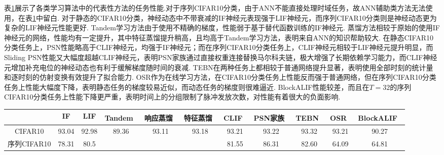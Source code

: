 \documentclass[10.5pt,compsoc,UTF8]{CjC}
\theoremstyle{mystyle}
\newcommand{\upcite}[1]{\textsuperscript{\cite{#1}}}
\begin{document}
\begin{multicols}{1}
表\ref{tab: cmp acc}展示了各类学习算法中的代表性方法的任务性能.对于序列CIFAR10分类，由于ANN不能直接处理时域任务，故ANN辅助类方法无法使用，在表\ref{tab: cmp acc}中留白.
对于静态的CIFAR10分类，神经动态中不带衰减的IF神经元表现强于LIF神经元，而序列CIFAR10分类则是神经动态更为复杂的LIF神经元性能更好.
Tandem学习方法由于使用不精确的梯度，性能弱于基于替代函数训练的IF神经元.
蒸馏方法相较于原始的使用IF神经元的网络，性能均有一定提升，其中特征蒸馏提升稍高，且均高于Tandem学习方法，表明来自ANN的知识帮助较大.
在静态CIFAR10分类任务上，PSN性能略高于CLIF神经元，均强于IF神经元；而在序列CIFAR10分类任务上，CLIF神经元相较于LIF神经元提升明显，而Sliding PSN性能又大幅度超越CLIF神经元，表明PSN家族通过直接权重连接替换马尔科夫链，极大增强了长期依赖学习能力，而CLIF神经元增加补充电位的神经动态也有利于缓解梯度随时间的衰减.
TEBN在两种任务上都相较于普通网络提升显著，表明使用全部时刻的统计量和逐时刻的仿射变换有效提升了拟合能力.
OSR作为在线学习方法，在CIFAR10分类任务上性能反而强于普通网络，但在序列CIFAR10分类任务上性能大幅度下降，表明静态任务的梯度较易近似，而动态任务的梯度则很难逼近.
BlockALIF性能较差，而且在$T=32$的序列CIFAR10分类任务上性能下降更严重，表明时间上的分组限制了脉冲发放次数，对性能有着很大的负面影响.
\begin{table}[H]
	\vspace {-2.5mm}
	\begin{center}
		\begin{tabular}{ccccccccccc}
			\toprule
			& IF    & LIF   & Tandem~\upcite{wu2021tandem} & 响应蒸馏~\upcite{xu2023constructing}  & 特征蒸馏~\upcite{xu2023constructing}  & CLIF~\upcite{huang2024clif}  & PSN家族~\upcite{fang2023parallel} & TEBN~\upcite{duan2022temporal}  & OSR~\upcite{zhu2024online} & BlockALIF~\upcite{NEURIPS2023_b9f253c2}  \\ \hline
			CIFAR10            & 93.04 & 92.98 & 89.36  & 93.11 & 93.18 & 93.21 & 93.22 & 93.32 & 93.21   & 90.27     \\
			序列CIFAR10 & 78.31 & 80.5  &       &      &      & 81.55 & 86.31 & 82.60  & 64.09   & 64.81    \\ 
			\bottomrule
		\end{tabular}
		\label{tab: cmp acc}
	\end{center}
\end{table}



\end{multicols}
\end{document}

